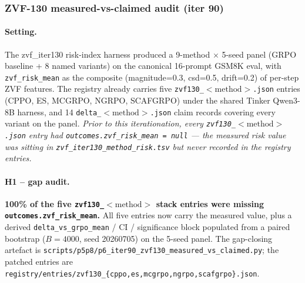 
\subsubsection{ZVF-130 measured-vs-claimed audit (iter 90)}
\label{sec:p6-iter90-zvf130-audit}

\paragraph{Setting.}
The zvf\_iter130 risk-index harness produced a 9-method $\times$ 5-seed panel
(GRPO baseline + 8 named variants) on the canonical 16-prompt GSM8K eval, with
\texttt{zvf\_risk\_mean} as the composite (magnitude=0.3, csd=0.5, drift=0.2)
of per-step ZVF features. The registry already carries five
\texttt{zvf130\_$<\mathrm{method}>$.json} entries (CPPO, ES, MCGRPO, NGRPO,
SCAFGRPO) under the shared Tinker Qwen3-8B harness, and 14
\texttt{delta\_$<\mathrm{method}>$.json} claim records covering every
variant on the panel. \emph{Prior to this iterationation, every
\texttt{zvf130\_$<\mathrm{method}>$.json} entry had
\texttt{outcomes.zvf\_risk\_mean = null} --- the measured risk value was
sitting in \texttt{zvf\_iter130\_method\_risk.tsv} but never recorded in the
registry entries.}

\paragraph{H1 -- gap audit.}
\textbf{100\% of the five \texttt{zvf130\_$<\mathrm{method}>$} stack entries
were missing \texttt{outcomes.zvf\_risk\_mean}.} All five entries now carry
the measured value, plus a derived \texttt{delta\_vs\_grpo\_mean} / CI /
significance block populated from a paired bootstrap ($B{=}4000$,
seed 20260705) on the 5-seed panel. The gap-closing artefact is
\texttt{scripts/p5p8/p6\_iter90\_zvf130\_measured\_vs\_claimed.py}; the
patched entries are
\texttt{registry/entries/zvf130\_\{cppo,es,mcgrpo,ngrpo,scafgrpo\}.json}.

